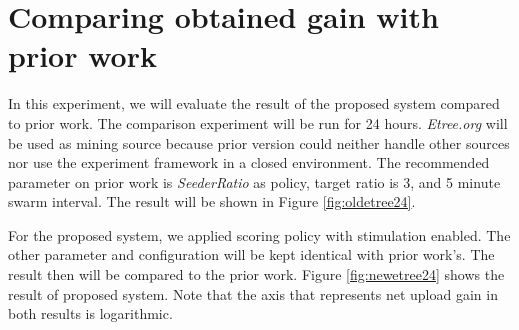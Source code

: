 \section{Comparing obtained gain with prior work}
In this experiment, we will evaluate the result of the proposed system compared to prior work. The comparison experiment will be run for 24 hours. \textit{Etree.org} will be used as mining source because prior version could neither handle other sources nor use the experiment framework in a closed environment. The recommended parameter on prior work is \textit{SeederRatio} as policy, target ratio is 3, and 5 minute swarm interval. The result will be shown in Figure \ref{fig:oldetree24}.

For the proposed system, we applied scoring policy with stimulation enabled. The other parameter and configuration will be kept identical with prior work's. The result then will be compared to the prior work. Figure \ref{fig:newetree24} shows the result of proposed system. Note that the axis that represents net upload gain in both results is logarithmic.

